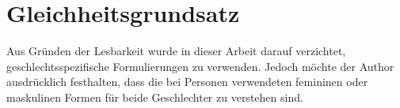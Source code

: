 
\chapter*{Gleichheitsgrundsatz}
Aus Gründen der Lesbarkeit wurde in dieser Arbeit darauf verzichtet, geschlechtsspezifische Formulierungen zu verwenden. Jedoch möchte der Author ausdrücklich
festhalten, dass die bei Personen verwendeten femininen oder maskulinen Formen für beide Geschlechter zu verstehen sind.
